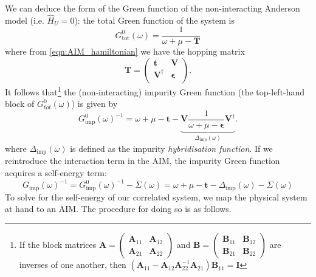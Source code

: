 \documentclass[10pt,a4paper,final]{article}
\begin{document}
We can deduce the form of the Green function of the non-interacting Anderson model (i.e. $\hat H_U = 0$): the total Green function of the system is
%
\begin{equation}
G^0_\text{tot}(\omega) = \frac{1}{\omega+\mu-\mathbf{T}}
\end{equation}
%
where from \ref{eqn:AIM_hamiltonian} we have the hopping matrix
%
\begin{equation}
\mathbf{T} = 
\begin{pmatrix}
\mathbf t      & \mathbf V \\
\mathbf V^\dag & \boldsymbol{\epsilon} \\
\end{pmatrix}.
\end{equation}
%
It follows that\footnote{
	If the block matrices $
	\mathbf A=
	\begin{pmatrix}
	\mathbf A_{11} & \mathbf A_{12} \\
	\mathbf A_{21} & \mathbf A_{22}
	\end{pmatrix}
	$ and $
	\mathbf B=
	\begin{pmatrix}
	\mathbf B_{11} & \mathbf B_{12} \\
	\mathbf B_{21} & \mathbf B_{22}
	\end{pmatrix}
	$ are inverses of one another, then $
	(\mathbf A_{11}-\mathbf A_{12}\mathbf A_{22}^{-1}\mathbf A_{21})\mathbf B_{11} = \mathbf I$
} the (non-interacting) impurity Green function (the top-left-hand block of $G^0_{tot}(\omega)$) is given by
%
\begin{equation}
{G_\text{imp}^0}(\omega)^{-1}
= \omega +\mu - \mathbf t - 
\underbrace{
\mathbf V\frac{1}{\omega+\mu-\boldsymbol{\epsilon}}\mathbf V^{\dag}
}_{
\Delta_\text{imp}(\omega)
}.
\label{eqn:DMFT_AIM_Gimp_nonint}
\end{equation}
%
where $\Delta_\text{imp}(\omega)$ is defined as the impurity \textit{hybridisation function}. %
If we reintroduce the interaction term in the AIM, the impurity Green function acquires a self-energy term:
%
\begin{equation}
G_\text{imp}(\omega)^{-1} 
= G_\text{imp}^0(\omega)^{-1}
- \Sigma(\omega)
= \omega + \mu - \mathbf t - \Delta_\text{imp}(\omega) - \Sigma(\omega)
\label{eqn:DMFT_AIM_Gimp}
\end{equation}
%
To solve for the self-energy of our correlated system, we map the physical system at hand to an AIM. The procedure for doing so is as follows.
\end{document}
